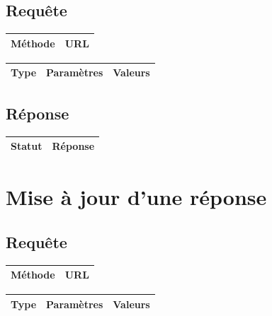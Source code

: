 \documentclass[titlepage]{report}
\begin{document}
\section{Requête}

\begin{center}
	\begin{tabular}{|c|c|}
		\hline
		Méthode & URL \\
		\hline
		
	\end{tabular}
\end{center}


\begin{center}
	\begin{tabular}{|c|c|c|}
		\hline
		Type & Paramètres & Valeurs \\
		\hline
		
	\end{tabular}
\end{center}


\section{Réponse}

\begin{center}
	\begin{tabular}{|c|c|}
		\hline
		Statut & Réponse \\
		\hline
		
	\end{tabular}
\end{center}

\chapter{Mise à jour d'une réponse}

\section{Requête}

\begin{center}
	\begin{tabular}{|c|c|}
		\hline
		Méthode & URL \\
		\hline
		
	\end{tabular}
\end{center}


\begin{center}
	\begin{tabular}{|c|c|c|}
		\hline
		Type & Paramètres & Valeurs \\
		\hline
		
	\end{tabular}
\end{center}
\end{document}
